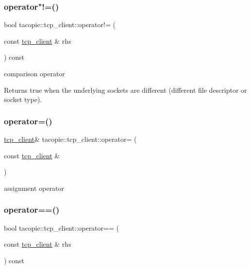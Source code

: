 \subsubsection{\texorpdfstring{operator"!=()}{operator!=()}}
{\footnotesize\ttfamily bool tacopie\+::tcp\+\_\+client\+::operator!= (\begin{DoxyParamCaption}\item[{const \hyperlink{classtacopie_1_1tcp__client}{tcp\+\_\+client} \&}]{rhs }\end{DoxyParamCaption}) const}

comparison operator

\begin{DoxyReturn}{Returns}
true when the underlying sockets are different (different file descriptor or socket type). 
\end{DoxyReturn}
\mbox{\label{classtacopie_1_1tcp__client_aeadcfb8cd727b2917ebcd357311d0a6b}} 
\subsubsection{\texorpdfstring{operator=()}{operator=()}}
{\footnotesize\ttfamily \hyperlink{classtacopie_1_1tcp__client}{tcp\+\_\+client}\& tacopie\+::tcp\+\_\+client\+::operator= (\begin{DoxyParamCaption}\item[{const \hyperlink{classtacopie_1_1tcp__client}{tcp\+\_\+client} \&}]{ }\end{DoxyParamCaption})\hspace{0.3cm}{\ttfamily [delete]}}



assignment operator 

\mbox{\label{classtacopie_1_1tcp__client_af7a1796c04efd00542349ecab692e073}} 
\subsubsection{\texorpdfstring{operator==()}{operator==()}}
{\footnotesize\ttfamily bool tacopie\+::tcp\+\_\+client\+::operator== (\begin{DoxyParamCaption}\item[{const \hyperlink{classtacopie_1_1tcp__client}{tcp\+\_\+client} \&}]{rhs }\end{DoxyParamCaption}) const}

